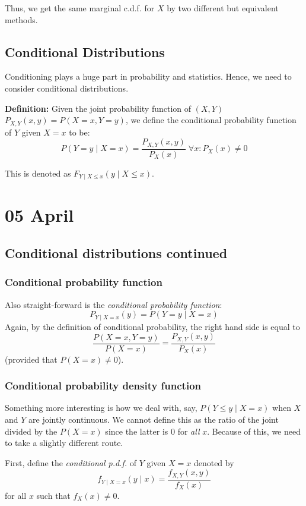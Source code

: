 \documentclass[12pt]{article}
\begin{document}
Thus, we get the same marginal c.d.f. for $X$ by two different but equivalent methods.

\subsection{Conditional Distributions}
Conditioning plays a huge part in probability and statistics. Hence, we need to consider conditional distributions.

\textbf{Definition:} Given the joint probability function of $(X,Y)$ $P_{X,Y} (x,y) = P(X = x, Y = y)$, we define the conditional probability function of $Y$ given $X = x$ to be:
\[
    P(Y = y \; | \; X = x) = \frac{P_{X,Y} (x,y)}{P_X (x)} \; \forall x : P_X (x) \neq 0
\]

This is denoted as $F_{Y \; | \; X \leq x} (y \; | \; X \leq x)$.
\section{05 April}
\subsection{Conditional distributions continued}
\subsubsection{Conditional probability function}
Also straight-forward is the \emph{conditional probability function}:
\[
    P_{Y \; | \; X = x} (y) = P(Y = y \; | \; X = x)
\]
Again, by the definition of conditional probability, the right hand side is equal to
\[
    \frac{P(X = x, Y = y)}{P(X = x)} = \frac{P_{X,Y} (x,y)}{P_X (x)}
\]
(provided that $P(X = x) \neq 0$).

\subsubsection{Conditional probability density function}
Something more interesting is how we deal with, say, $P(Y \leq y \; | \; X = x)$ when $X$ and $Y$ are jointly continuous. We cannot define this as the ratio of the joint divided by the $P(X = x)$ since the latter is $0$ for \emph{all} $x$. Because of this, we need to take a slightly different route. 

First, define the \emph{conditional p.d.f.} of $Y$ given $X=x$ denoted by 
\[
    f_{Y \; | \; X = x} (y \; | \; x) = \frac{f_{X,Y} (x,y)}{f_X (x)}
\]
for all $x$ such that $f_X (x) \neq 0$. 
\end{document}
